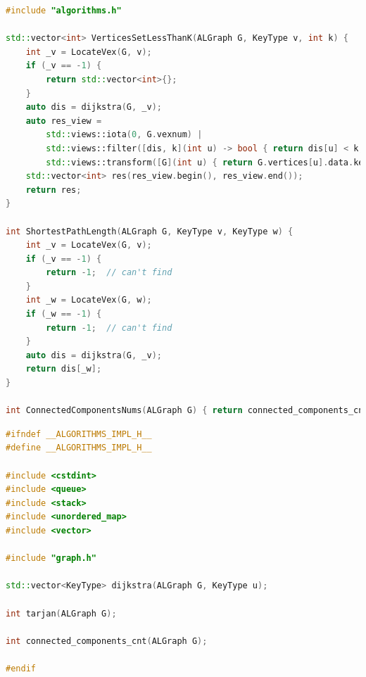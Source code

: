\documentclass[supercite]{Experimental_Report}
\theoremstyle{definition}
\begin{document}
\begin{lstlisting}[caption={$algorithms.cpp$}, language=C++, frame=single]
#include "algorithms.h"

std::vector<int> VerticesSetLessThanK(ALGraph G, KeyType v, int k) {
	int _v = LocateVex(G, v);
	if (_v == -1) {
		return std::vector<int>{};
	}
	auto dis = dijkstra(G, _v);
	auto res_view =
		std::views::iota(0, G.vexnum) |
		std::views::filter([dis, k](int u) -> bool { return dis[u] < k; }) |
		std::views::transform([G](int u) { return G.vertices[u].data.key; });
	std::vector<int> res(res_view.begin(), res_view.end());
	return res;
}

int ShortestPathLength(ALGraph G, KeyType v, KeyType w) {
	int _v = LocateVex(G, v);
	if (_v == -1) {
		return -1;  // can't find
	}
	int _w = LocateVex(G, w);
	if (_w == -1) {
		return -1;  // can't find
	}
	auto dis = dijkstra(G, _v);
	return dis[_w];
}

int ConnectedComponentsNums(ALGraph G) { return connected_components_cnt(G); }
\end{lstlisting}

\begin{lstlisting}[caption={$algorithms\_impl.h$}, language=C++, frame=single]
#ifndef __ALGORITHMS_IMPL_H__
#define __ALGORITHMS_IMPL_H__

#include <cstdint>
#include <queue>
#include <stack>
#include <unordered_map>
#include <vector>

#include "graph.h"

std::vector<KeyType> dijkstra(ALGraph G, KeyType u);

int tarjan(ALGraph G);

int connected_components_cnt(ALGraph G);

#endif
\end{lstlisting}
\end{document}
